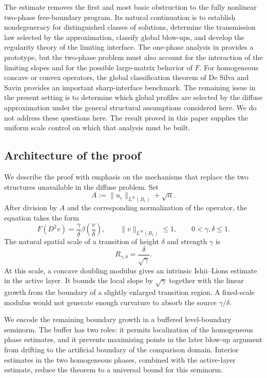 \documentclass[11pt,letterpaper]{amsart}
\numberwithin{equation}{section}
\newcommand{\eps}{\varepsilon}
\theoremstyle{definition}
\theoremstyle{remark}
\begin{document}
The estimate removes the first and most basic obstruction to the fully
nonlinear two-phase free-boundary program. Its natural continuation is to
establish nondegeneracy for distinguished classes of solutions, determine the
transmission law selected by the approximation, classify global blow-ups, and
develop the regularity theory of the limiting interface. The one-phase
analysis in \cite{RicarteTeixeira} provides a prototype, but the two-phase
problem must also account for the interaction of the limiting slopes and for
the possible large-matrix behavior of $F$. For homogeneous concave or convex operators, the global classification
theorem of De Silva and Savin \cite{DeSilvaSavinGlobal} provides an
important sharp-interface benchmark. The remaining issue in the present
setting is to determine which global profiles are selected by the diffuse
approximation under the general structural assumptions considered here. We do not address these questions
here. The result proved in this paper supplies the uniform scale control on
which that analysis must be built.

\subsection{Architecture of the proof}

We describe the proof with emphasis on the mechanisms that replace the two
structures unavailable in the diffuse problem. Set
$$
A
:=
\|u_\eps\|_{L^\infty(B_1)}+\sqrt\alpha.
$$
After division by $A$ and the corresponding normalization of the operator,
the equation takes the form
$$
F(D^2v)
=
\frac\gamma\delta
\beta\left(\frac v\delta\right),
\qquad
\|v\|_{L^\infty(B_1)}\leq1,
\qquad
0<\gamma,\delta\leq1.
$$
The natural spatial scale of a transition of height $\delta$ and strength
$\gamma$ is
$$
R_{\gamma,\delta}
=
\frac\delta{\sqrt\gamma}.
$$
At this scale, a concave doubling modulus gives an intrinsic
Ishii--Lions estimate in the active layer. It bounds the local slope by
$\sqrt\gamma$ together with the linear growth from the boundary of a slightly
enlarged transition region. A fixed-scale modulus would not generate enough
curvature to absorb the source $\gamma/\delta$.

We encode the remaining boundary growth in a buffered level-boundary
seminorm. The buffer has two roles: it permits localization of the homogeneous
phase estimates, and it prevents maximizing points in the later blow-up
argument from drifting to the artificial boundary of the comparison domain.
Interior estimates in the two homogeneous phases, combined with the
active-layer estimate, reduce the theorem to a universal bound for this
seminorm.
\end{document}

